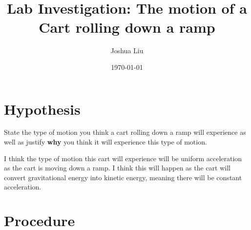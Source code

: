 \documentclass[12pt]{article}
\title{Lab Investigation: The motion of a Cart rolling down a ramp}
\author{Joshua Liu}
\date{\today}
\begin{document}
\maketitle
\section{Hypothesis}
State the type of motion you think a cart rolling down a ramp will experience as well as justify \textbf{why} you think it will experience this type of motion.

I think the type of motion this cart will experience will be uniform acceleration as the cart is moving down a ramp. I think this will happen as the cart will convert gravitational energy into kinetic energy, meaning there will be constant acceleration.
\section{Procedure}
\end{document}
